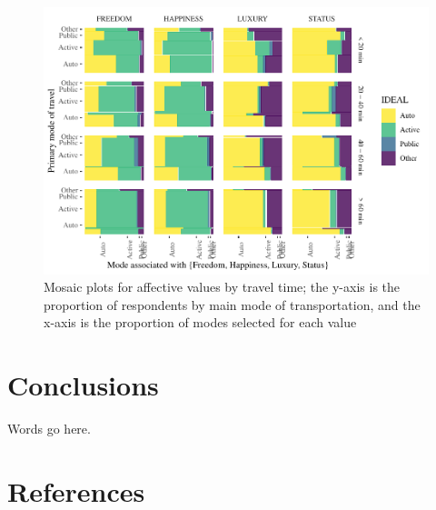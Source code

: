 \documentclass[]{elsarticle} %
\makeatletter
\def\maxwidth{\ifdim\Gin@nat@width>\linewidth\linewidth
\else\Gin@nat@width\fi}
\let\Oldincludegraphics\includegraphics
\renewcommand{\includegraphics}[1]{\Oldincludegraphics[width=\maxwidth]{#1}}
\makeatother
\begin{document}
\begin{figure}
\centering
\includegraphics{Dissonance_Santiago_v1_files/figure-latex/figure-mosaic-plots-by-attribute-and-time-without-instrumental-1.pdf}
\caption{\label{fig:mosaic-plots-by-travel-time}Mosaic plots for
affective values by travel time; the y-axis is the proportion of
respondents by main mode of transportation, and the x-axis is the
proportion of modes selected for each value}
\end{figure}

\hypertarget{conclusions}{%
\section{Conclusions}\label{conclusions}}

Words go here.

\hypertarget{references}{%
\section*{References}\label{references}}
\end{document}
